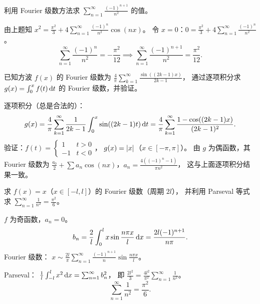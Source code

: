 \documentclass{ctexart}
\begin{document}
\begin{exercise}
  利用 Fourier 级数方法求 $\sum_{n=1}^\infty \frac{(-1)^{n+1}}{n^2}$ 的值。
\end{exercise}

\begin{solution}
  由上题知 $x^2 = \frac{\pi^2}{3} + 4\sum_{n=1}^\infty \frac{(-1)^n}{n^2}\cos(nx)$。
  令 $x = 0$：$0 = \frac{\pi^2}{3} + 4\sum_{n=1}^\infty \frac{(-1)^n}{n^2}$。
  \[
    \sum_{n=1}^\infty \frac{(-1)^n}{n^2} = -\frac{\pi^2}{12}
    \implies \sum_{n=1}^\infty \frac{(-1)^{n+1}}{n^2} = \frac{\pi^2}{12}.
  \]
\end{solution}

\begin{exercise}[逐项积分]
  已知方波 $f(x)$ 的 Fourier 级数为 $\frac{4}{\pi}\sum_{k=1}^\infty \frac{\sin((2k-1)x)}{2k-1}$，
  通过逐项积分求 $g(x) = \int_0^x f(t) \,\mathrm{d} t$ 的 Fourier 级数，并验证。
\end{exercise}

\begin{solution}
  逐项积分（总是合法的）：
  \[
    g(x) = \frac{4}{\pi}\sum_{k=1}^\infty \frac{1}{2k-1}\int_0^x \sin((2k-1)t) \,\mathrm{d} t
    = \frac{4}{\pi}\sum_{k=1}^\infty \frac{1-\cos((2k-1)x)}{(2k-1)^2}.
  \]
  验证：$f(t) = \begin{cases} 1 & t > 0 \\ -1 & t < 0 \end{cases}$，
  $g(x) = \left| x \right|$（$x \in [-\pi,\pi]$）。
  由 $g$ 为偶函数，其 Fourier 级数为
  $\frac{a_0}{2} + \sum a_n\cos(nx)$，$a_n = \frac{4((-1)^n-1)}{\pi n^2}$，
  这与上面逐项积分结果一致。
\end{solution}

\begin{exercise}[任意周期 $2L$]
  求 $f(x) = x$（$x \in [-l, l]$）的 Fourier 级数（周期 $2l$），
  并利用 Parseval 等式求 $\sum_{n=1}^\infty \frac{1}{n^2} = \frac{\pi^2}{6}$。
\end{exercise}

\begin{solution}
  $f$ 为奇函数，$a_n = 0$。
  \[
    b_n = \frac{2}{l}\int_0^l x\sin\frac{n\pi x}{l} \,\mathrm{d} x
    = \frac{2l(-1)^{n+1}}{n\pi}.
  \]
  Fourier 级数：
  $x \sim \frac{2l}{\pi}\sum_{n=1}^\infty \frac{(-1)^{n+1}}{n}\sin\frac{n\pi x}{l}$。

  Parseval：
  $\frac{1}{l}\int_{-l}^l x^2 \,\mathrm{d} x = \sum_{n=1}^\infty b_n^2$，
  即 $\frac{2l^2}{3} = \frac{4l^2}{\pi^2}\sum_{n=1}^\infty\frac{1}{n^2}$。
  \[
    \sum_{n=1}^\infty \frac{1}{n^2} = \frac{\pi^2}{6}.
  \]
\end{solution}
\end{document}
